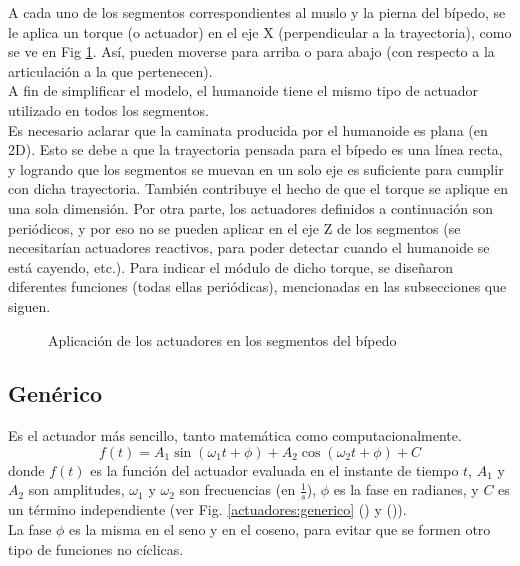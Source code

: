 \documentclass{article}
\begin{document}
A cada uno de los segmentos correspondientes al muslo y la pierna del b\'ipedo, se le aplica un torque (o actuador) en el eje X (perpendicular a la trayectoria), como se ve en Fig \ref{fig:actuator}. As\'i, pueden moverse para arriba o para abajo (con respecto a la articulaci\'on a la que pertenecen). \\
A fin de simplificar el modelo, el humanoide tiene el mismo tipo de actuador utilizado en todos los segmentos.\\
Es necesario aclarar que la caminata producida por el humanoide es plana (en 2D). Esto se debe a que la trayectoria pensada para el b\'ipedo es una l\'inea recta, y logrando que los segmentos se muevan en un solo eje es suficiente para cumplir con dicha trayectoria. Tambi\'en contribuye el hecho de que el torque se aplique en una sola dimensi\'on. Por otra parte, los actuadores definidos a continuaci\'on son peri\'odicos, y por eso no se pueden aplicar en el eje Z de los segmentos (se necesitar\'ian actuadores reactivos, para poder detectar cuando el humanoide se est\'a cayendo, etc.). Para indicar el m\'odulo de dicho torque, se dise\~naron diferentes funciones (todas ellas peri\'odicas), mencionadas en las subsecciones que siguen. \\
\begin{figure}[H]%
  \centering
    \caption{Aplicaci\'on de los actuadores en los segmentos del b\'ipedo}
    \label{fig:actuator} 
\end{figure} 

\subsection{Gen\'erico}
Es el actuador m\'as sencillo, tanto matem\'atica como computacionalmente.
\begin{equation}
  f(t) =  A_1 \sin(\omega_1t+\phi)+A_2 \cos(\omega_2t+\phi)+C
\end{equation}
donde $f(t)$ es la funci\'on del actuador evaluada en el instante de tiempo $t$, $A_{1}$ y $A_{2}$ son amplitudes, $\omega_1$ y $\omega_2$ son frecuencias (en $\frac{1}{s}$), $\phi$ es la fase en radianes, y $C$ es un t\'ermino independiente (ver Fig. \ref{actuadores:generico} () y ()).\\
La fase $\phi$ es la misma en el seno y en el coseno, para evitar que se formen otro tipo de funciones no c\'iclicas.
\end{document}
